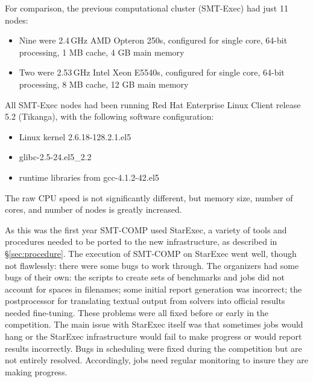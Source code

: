 \documentclass[twoside,11pt]{article}
\begin{document}
For comparison, the previous computational cluster (SMT-Exec) had just 11 nodes:
\begin{itemize}[noitemsep,nolistsep]
\item Nine were 2.4\,GHz AMD Opteron 250s, configured for single core, 64-bit processing, 1 MB cache, 4 GB main memory
\item Two were 2.53\,GHz Intel Xeon E5540s, configured for single core, 64-bit processing, 8 MB cache, 12 GB main memory
\end{itemize}
All SMT-Exec nodes had been running Red Hat Enterprise Linux Client release 5.2 (Tikanga), with the following software configuration:
\begin{itemize}[noitemsep,nolistsep]
\item Linux kernel 2.6.18-128.2.1.el5
\item glibc-2.5-24.el5\_2.2
\item runtime libraries from gcc-4.1.2-42.el5
\end{itemize}
The raw CPU speed is not significantly different, but memory size, number of cores, and number of nodes is greatly increased.

As this was the first year SMT-COMP used StarExec, a variety of tools and procedures needed to be ported to the new infrastructure, as described in \S\ref{sec:procedure}.
The execution of SMT-COMP on StarExec went well, though not flawlessly: there were some bugs to work through.
The organizers had some bugs of their own: the scripts to create sets of benchmarks and jobs did not account for spaces in filenames; some initial report generation was incorrect; the postprocessor for translating textual output from solvers into official results needed fine-tuning. These problems were all fixed before or early in the competition. The main issue with StarExec itself was that sometimes jobs would hang or the StarExec infrastructure would fail to make
progress or would report results incorrectly. Bugs in scheduling were
fixed during the competition but are not entirely resolved. Accordingly, jobs need regular monitoring to insure they are making progress.
\end{document}
